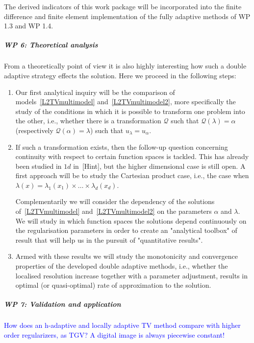 \documentclass[enabledeprecatedfontcommands,cleardoublepage=empty,headsepline,twoside,11pt,DIV=15,BCOR=12mm,final]{scrartcl}
\begin{document}
The derived indicators of this work package will be incorporated into the finite difference and finite element implementation of the fully adaptive methods of WP 1.3 and WP 1.4.
 
 \subparagraph{WP 6: Theoretical analysis}

From a theoretically point of view it is also highly interesting how such a double adaptive strategy effects the solution. Here we proceed in the following steps:
 
 \begin{enumerate}
 \item Our first analytical inquiry will be the comparison of models~\eqref{L2TVmultimodel} and~\eqref{L2TVmultimodel2}, more specifically the study of the conditions in which it is possible to transform one problem into the other, i.e., whether there is a transformation $\mathcal{Q}$ such that $\mathcal{Q}(\lambda)=\alpha$ (respectively $\mathcal{Q}(\alpha)=\lambda$) such that $u_\lambda = u_\alpha$. 
 
 \item If such a transformation exists, then the follow-up question concerning continuity with respect to certain function spaces is tackled. This has already been studied in $1d$ in~{[Hint]}, 
but the higher dimensional case is still open. A first approach will be to study the Cartesian product case, i.e., the case when $\lambda(x)=\lambda_1(x_1)\times \dots \times \lambda_d(x_d)$.

Complementarily we will consider the dependency of the solutions of~\eqref{L2TVmultimodel} and~\eqref{L2TVmultimodel2} on the parameters  $\alpha$ and $\lambda$. We will study in which function spaces the solutions depend continuously on the regularisation parameters in order to create an "analytical toolbox" of result that will help us in the pursuit of "quantitative results". 
 
 \item Armed with these results we will study the monotonicity and convergence properties of the developed double adaptive methods, i.e., whether the localised resolution increase together with a parameter adjustment, results in optimal (or quasi-optimal) rate of approximation to the solution. 
 \end{enumerate} 
 
\subparagraph{WP 7: Validation and application} 
 
 \textcolor{blue}{How does an h-adaptive and locally adaptive TV method compare with higher order regularizers, as TGV? A digital image is always piecewise constant!}
 
\end{document}
